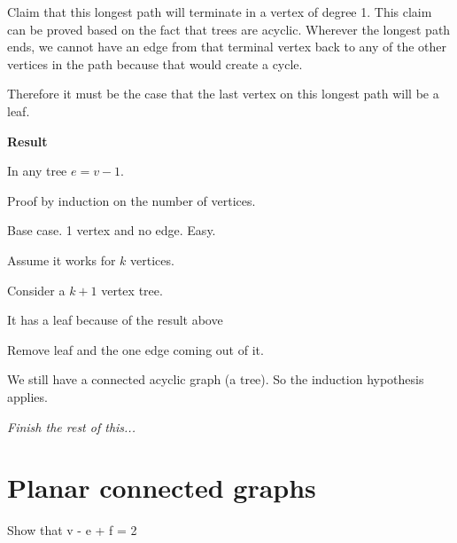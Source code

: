 \documentclass[12pt]{article}
\begin{document}
Claim that this longest path will terminate in a vertex of degree 1. This claim can be proved based on the fact that trees are acyclic. Wherever the longest path ends, we cannot have an edge from that terminal vertex back to any of the other vertices in the path because that would create a cycle.

Therefore it must be the case that the last vertex on this longest path will be a leaf.


\textbf{Result}

In any tree $e = v - 1$.

Proof by induction on the number of vertices.

Base case. 1 vertex and no edge. Easy.

Assume it works for $k$ vertices. 

Consider a $k+1$ vertex tree.

It has a leaf because of the result above

Remove leaf and the one edge coming out of it.

We still have a connected acyclic graph (a tree).  So the induction hypothesis applies.

\textit{Finish the rest of this...}


\section*{Planar connected graphs}

Show that v - e + f = 2
 
\end{document}
